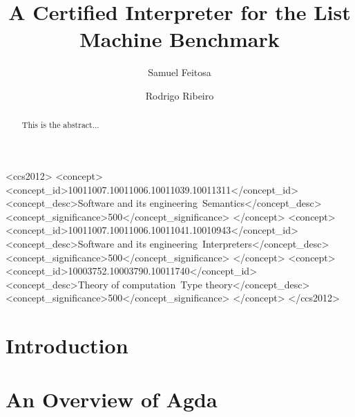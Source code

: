\documentclass[sigconf]{acmart}
\begin{document}
\title{A Certified Interpreter for the List Machine Benchmark}

\author{Samuel Feitosa}
\authornotemark[1]

\author{Rodrigo Ribeiro}


\begin{abstract}
This is the abstract...
\end{abstract}

\begin{CCSXML}
<ccs2012>
<concept>
<concept_id>10011007.10011006.10011039.10011311</concept_id>
<concept_desc>Software and its engineering~Semantics</concept_desc>
<concept_significance>500</concept_significance>
</concept>
<concept>
<concept_id>10011007.10011006.10011041.10010943</concept_id>
<concept_desc>Software and its engineering~Interpreters</concept_desc>
<concept_significance>500</concept_significance>
</concept>
<concept>
<concept_id>10003752.10003790.10011740</concept_id>
<concept_desc>Theory of computation~Type theory</concept_desc>
<concept_significance>500</concept_significance>
</concept>
</ccs2012>
\end{CCSXML}



\maketitle

\section{Introduction}

\section{An Overview of Agda}\label{sec:agda}
\end{document}
